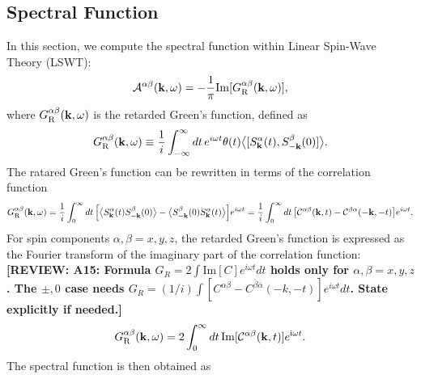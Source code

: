 \documentclass[aps, prx, nofootinbib, superscriptaddress]{revtex4-2}
\newcommand{\REVIEW}[1]{{\color{reviewcolor}\bfseries [REVIEW: #1]}}
\newcommand{\kvec}{\mathbf{k}}
\newcommand{\ri}{\mathrm{i}}
\begin{document}
\subsection{Spectral Function}\label{subsec: Spectral Function}

In this section, we compute the spectral function within Linear Spin-Wave Theory (LSWT):
\begin{equation}
    \mathcal{A}^{\alpha\beta}(\kvec, \omega) = - \frac{1}{\pi} \mathrm{Im} [G^{\alpha\beta}_{\rm R} (\kvec, \omega)],
\end{equation}
where $G^{\alpha\beta}_{\rm R} (\kvec, \omega)$ is the retarded Green's function, defined as
\begin{equation}
    G^{\alpha\beta}_{\rm R} (\kvec, \omega) 
    \equiv  \frac{1}{i} \int_{-\infty}^{\infty} dt \, e^{i\omega t} \theta(t) \big\langle [S_{\kvec}^{\alpha} (t), S_{-\kvec}^{\beta} (0)] \big\rangle . 
\end{equation}
The ratared Green's function can be rewritten in terms of the correlation function
\begin{equation}
    G^{\alpha\beta}_{\rm R} (\kvec, \omega) 
    = \frac{1}{i} \int_{0}^{\infty} dt \, \Big[ \big\langle S_{\kvec}^{\alpha} (t) S_{-\kvec}^{\beta} (0) \big\rangle - \big\langle S_{-\kvec}^{\beta} (0) S_{\kvec}^{\alpha} (t) \big\rangle \Big] e^{i \omega t} 
    = \frac{1}{i} \int_{0}^{\infty} dt \, \big[ \mathcal{C}^{\alpha\beta}(\kvec, t) - \mathcal{C}^{\beta\alpha}(-\kvec, -t) \big] e^{i \omega t}.
\end{equation}
For spin components $\alpha, \beta = x, y, z$, the retarded Green's function is expressed as the Fourier transform of the imaginary part of the correlation function:
\REVIEW{A15: Formula $G_R = 2\int \mathrm{Im}[C] e^{i\omega t} dt$ holds only for $\alpha,\beta=x,y,z$. The $\pm,0$ case needs $G_R = (1/i)\int [C^{\alpha\beta} - C^{\bar{\beta}\bar{\alpha}}(-k,-t)] e^{i\omega t} dt$. State explicitly if needed.}
\begin{equation}
    G^{\alpha\beta}_{\rm R} (\kvec, \omega) 
    = 2 \int_{0}^{\infty} dt \, \mathrm{Im} [\mathcal{C}^{\alpha\beta}(\kvec, t) ] e^{\ri \omega t}.
\end{equation}
The spectral function is then obtained as
\end{document}
